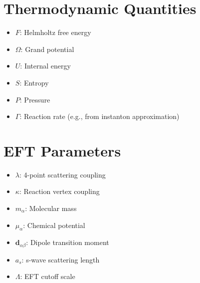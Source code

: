 \section{Thermodynamic Quantities}
\begin{itemize}
	\item \(F\): Helmholtz free energy
	\item \(\Omega\): Grand potential
	\item \(U\): Internal energy
	\item \(S\): Entropy
	\item \(P\): Pressure
	\item \(\Gamma\): Reaction rate (e.g., from instanton approximation)
\end{itemize}

\section{EFT Parameters}
\begin{itemize}
	\item \(\lambda\): 4-point scattering coupling
	\item \(\kappa\): Reaction vertex coupling
	\item \(m_\alpha\): Molecular mass
	\item \(\mu_\alpha\): Chemical potential
	\item \(\mathbf{d}_{\alpha\beta}\): Dipole transition moment
	\item \(a_s\): s-wave scattering length
	\item \(\Lambda\): EFT cutoff scale
\end{itemize}

